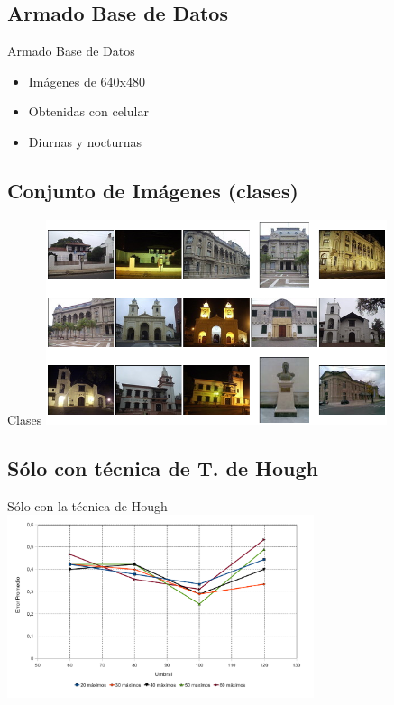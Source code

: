 \documentclass[spanish]{beamer}
\begin{document}
\section[Pruebas]{}
\subsection{Armado Base de Datos}
\begin{frame}{Armado Base de Datos}
  \begin{itemize}
  \item Imágenes de 640x480
  \item Obtenidas con celular
  \item Diurnas y nocturnas
  \end{itemize}
\end{frame}
\subsection{Conjunto de Imágenes (clases)}
\begin{frame}{Clases}
\includegraphics[width=10cm]{img/mosaico.png} 
\end{frame}

\subsection{Sólo con técnica de T. de Hough}
\begin{frame}{Sólo con la técnica de Hough}
  \includegraphics[width=9cm]{../diagramas/estadistica_noche_iguales}
\end{frame}
\end{document}
